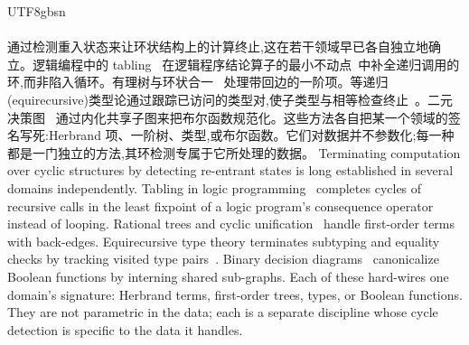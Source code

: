 \begin{CJK*}{UTF8}{gbsn}
  \paragraph{}
  \ifPaperChinese
  通过检测重入状态来让环状结构上的计算终止,这在若干领域早已各自独立地确立。逻辑编程中的 tabling~\cite{tamaki1986-tabled-resolution, chen1996-tabled-evaluation-delaying} 在逻辑程序结论算子的最小不动点~\cite{vanemden1976-predicate-logic-semantics}中补全递归调用的环,而非陷入循环。有理树与环状合一~\cite{colmerauer1984-trees, courcelle1983-infinite-trees} 处理带回边的一阶项。等递归(equirecursive)类型论通过跟踪已访问的类型对,使子类型与相等检查终止~\cite{amadio1993-subtyping-recursive-types, brandt1998-coinductive-type-equality}。二元决策图~\cite{bryant1986-bdd} 通过内化共享子图来把布尔函数规范化。这些方法各自把某一个领域的签名写死:Herbrand 项、一阶树、类型,或布尔函数。它们对数据并不参数化;每一种都是一门独立的方法,其环检测专属于它所处理的数据。
  \else
  Terminating computation over cyclic structures by detecting re-entrant states is long established in several domains independently. Tabling in logic programming~\cite{tamaki1986-tabled-resolution, chen1996-tabled-evaluation-delaying} completes cycles of recursive calls in the least fixpoint of a logic program's consequence operator~\cite{vanemden1976-predicate-logic-semantics} instead of looping. Rational trees and cyclic unification~\cite{colmerauer1984-trees, courcelle1983-infinite-trees} handle first-order terms with back-edges. Equirecursive type theory terminates subtyping and equality checks by tracking visited type pairs~\cite{amadio1993-subtyping-recursive-types, brandt1998-coinductive-type-equality}. Binary decision diagrams~\cite{bryant1986-bdd} canonicalize Boolean functions by interning shared sub-graphs. Each of these hard-wires one domain's signature: Herbrand terms, first-order trees, types, or Boolean functions. They are not parametric in the data; each is a separate discipline whose cycle detection is specific to the data it handles.
  \fi


\end{CJK*}
